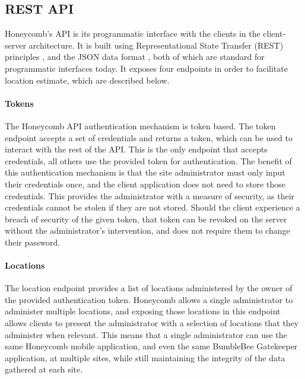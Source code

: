\subsection{REST API}
%


Honeycomb's API is its programmatic interface with the clients in the client-server architecture. It is built using Representational State Transfer (REST) principles \cite{fielding2002principled}, and the JSON data format \cite{json}, both of which are standard for programmatic interfaces today. It exposes four endpoints in order to facilitate location estimate, which are described below.


\paragraph{Tokens}
%

The Honeycomb API authentication mechanism is token based. The token endpoint accepts a set of credentials and returns a token, which can be used to interact with the rest of the API. This is the only endpoint that accepts credentials, all others use the provided token for authentication. The benefit of this authentication mechanism is that the site administrator must only input their credentials once, and the client application does not need to store those credentials. This provides the administrator with a measure of security, as their credentials cannot be stolen if they are not stored. Should the client experience a breach of security of the given token, that token can be revoked on the server without the administrator's intervention, and does not require them to change their password. 


\paragraph{Locations}
%

The location endpoint provides a list of locations administered by the owner of the provided authentication token. Honeycomb allows a single administrator to administer multiple locations, and exposing those locations in this endpoint allows clients to present the administrator with a selection of locations that they administer when relevant. This means that a single administrator can use the same Honeycomb mobile application, and even the same BumbleBee Gatekeeper application, at multiple sites, while still maintaining the integrity of the data gathered at each site. 


